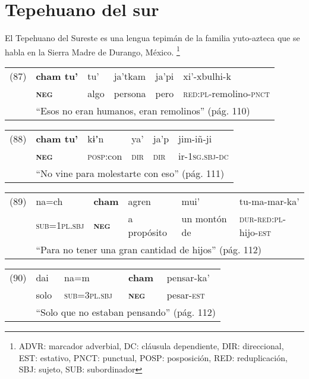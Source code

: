 \section*{Tepehuano del sur}

\noindent El Tepehuano del Sureste es una lengua tepimán de la familia yuto-azteca que se habla en la Sierra Madre de Durango, México.
\footnote{ADVR: marcador adverbial, DC: cláusula dependiente, DIR: direccional, EST: estativo, PNCT: punctual, POSP: posposición, RED: reduplicación, SBJ: sujeto, SUB: subordinador}


\vspace{0.5cm}

{\setmainfont{Charis SIL} 

\noindent \begin{tabular}{llllll}
(87) & \textbf{cham tu’} & tu’ & ja’tkam & ja’pi & xi’-xbulhi-k  \\
& \textsc{\textbf{neg}} & algo & persona & pero & \textsc{red:pl}-remolino-\textsc{pnct}\\
& \multicolumn{5}{l}{``Esos no eran humanos, eran remolinos'' (pág. 110)}
\end{tabular} \vspace{0.5cm}

\noindent \begin{tabular}{llllll}
(88) & \textbf{cham tu’} & kɨʼn & ya’ & ja’p & jim-iñ-ji \\
& \textsc{\textbf{neg}} & \textsc{posp}:con & \textsc{dir} & \textsc{dir} & ir-\textsc{1sg.sbj-dc} \\
& \multicolumn{5}{l}{``No vine para molestarte con eso'' (pág. 111)}
\end{tabular} \vspace{0.5cm}

\noindent \begin{tabular}{llllll}
(89) & na=ch & \textbf{cham} & agren & mui’ & tu-ma-mar-ka’ \\
& \textsc{sub=1pl.sbj} & \textsc{\textbf{neg}} & a propósito & un montón de & \textsc{dur-red:pl}-hijo-\textsc{est} \\
& \multicolumn{5}{l}{``Para no tener una gran cantidad de hijos'' (pág. 112)}
\end{tabular} \vspace{0.5cm}

\noindent \begin{tabular}{lllll}
(90) & dai & na=m & \textbf{cham} & pensar-ka’ \\
& solo & \textsc{sub=3pl.sbj} & \textsc{\textbf{neg}} & pesar-\textsc{est} \\
& \multicolumn{4}{l}{``Solo que no estaban pensando'' (pág. 112)}
\end{tabular} \vspace{0.5cm}

}
